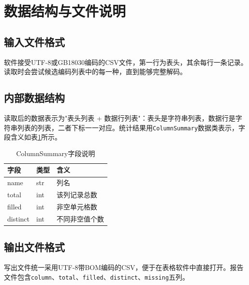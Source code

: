 %
%

\section{数据结构与文件说明}
\label{sec:data_structure}

\subsection{输入文件格式}
\label{ssec:input_format}
软件接受UTF-8或GB18030编码的CSV文件，第一行为表头，其余每行一条记录。读取时会尝试候选编码列表中的每一种，直到能够完整解码。

\subsection{内部数据结构}
\label{ssec:internal_data}
读取后的数据表示为"表头列表 + 数据行列表"：表头是字符串列表，数据行是字符串列表的列表，二者下标一一对应。统计结果用\lstinline|ColumnSummary|数据类表示，字段含义如表\ref{tab:column_summary}所示。

\begin{table}[H]
\centering
\begin{tabular}{lll}
\toprule
\textbf{字段} & \textbf{类型} & \textbf{含义} \\
\midrule
name & str & 列名 \\
total & int & 该列记录总数 \\
filled & int & 非空单元格数 \\
distinct & int & 不同非空值个数 \\
\bottomrule
\end{tabular}
\caption{ColumnSummary字段说明}
\label{tab:column_summary}
\end{table}

\subsection{输出文件格式}
\label{ssec:output_format}
写出文件统一采用UTF-8带BOM编码的CSV，便于在表格软件中直接打开。报告文件包含\lstinline|column|、\lstinline|total|、\lstinline|filled|、\lstinline|distinct|、\lstinline|missing|五列。

